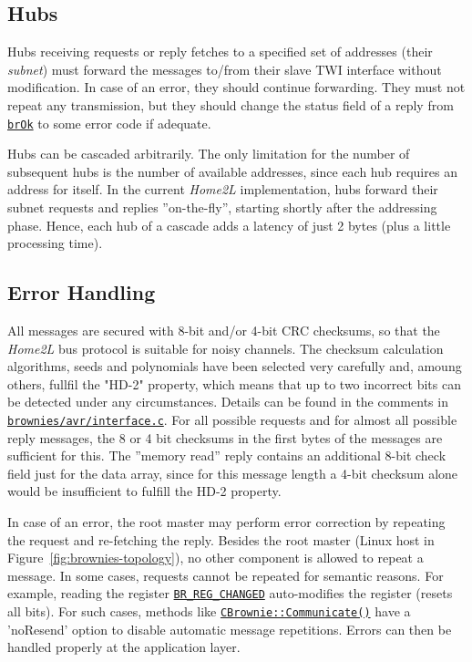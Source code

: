 \documentclass[12pt,english,parskip=half,headheight=19pt]{scrreprt}
\newcommand{\refsrc}[1]{\href{#1}{\texttt{#1}}}     %
\newcommand{\refapic}[1]{\href{home2l-api_c/index.html}{\mbox{\texttt{#1}}}}            %
\begin{document}
\subsection{Hubs}
\label{sec:brownies-bus-hubs}

Hubs receiving requests or reply fetches to a specified set of addresses (their \textit{subnet}) must forward the messages to/from their slave TWI interface without modification. In case of an error, they should continue forwarding. They must not repeat any transmission, but they should change the status field of a reply from \refapic{brOk} to some error code if adequate.

Hubs can be cascaded arbitrarily. The only limitation for the number of subsequent hubs is the number of available addresses, since each hub requires an address for itself. In the current \textit{Home2L} implementation, hubs forward their subnet requests and replies ''on-the-fly'', starting shortly after the addressing phase. Hence, each hub of a cascade adds a latency of just 2 bytes (plus a little processing time).



\subsection{Error Handling}
\label{sec:brownies-bus-errors}

All messages are secured with 8-bit and/or 4-bit CRC checksums, so that the \textit{Home2L} bus protocol is suitable for noisy channels. The checksum calculation algorithms, seeds and polynomials have been selected very carefully and, amoung others, fullfil the "HD-2" property, which means that up to two incorrect bits can be detected under any circumstances. Details can be found in the comments in \refsrc{brownies/avr/interface.c}.
For all possible requests and for almost all possible reply messages, the 8 or 4 bit checksums in the first bytes of the messages are sufficient for this. The ''memory read'' reply contains an additional 8-bit check field just for the data array, since for this message length a 4-bit checksum alone would be insufficient to fulfill the HD-2 property.

In case of an error, the root master may perform error correction by repeating the request and re-fetching the reply. Besides the root master (Linux host in Figure~\ref{fig:brownies-topology}), no other component is allowed to repeat a message. In some cases, requests cannot be repeated for semantic reasons. For example, reading the register \refapic{BR\_REG\_CHANGED} auto-modifies the register (resets all bits). For such cases, methods like \refapic{CBrownie::Communicate()} have a 'noResend' option to disable automatic message repetitions. Errors can then be handled properly at the application layer.
\end{document}
